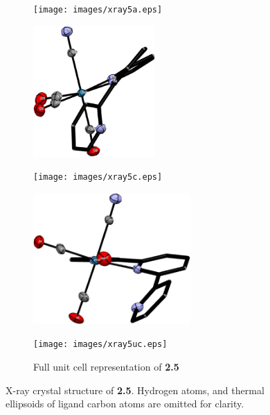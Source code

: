 \begin{figure}[!ht]
 \centering
 \begin{subfigure}[b]{0.49\textwidth}
  \texttt{[image: images/xray5a.eps]}
 \end{subfigure}
 \begin{subfigure}[b]{0.49\textwidth}
  \includegraphics[clip=true, width=\textwidth, height=50mm, keepaspectratio]{images/xray5b.eps}
 \end{subfigure}
 \begin{subfigure}[b]{0.49\textwidth}
  \texttt{[image: images/xray5c.eps]}
 \end{subfigure}
 \begin{subfigure}[b]{0.49\textwidth}
  \includegraphics[clip=true, width=\textwidth, height=50mm, keepaspectratio]{images/xray5d.eps}
 \end{subfigure}
 \begin{subfigure}[b]{\textwidth}
  \centering
  \texttt{[image: images/xray5uc.eps]}
  \caption{Full unit cell representation of \textbf{2.5}}
 \end{subfigure}
\caption[X-ray crystal structure of \textbf{2.5}]{X-ray crystal structure of \textbf{2.5}. Hydrogen atoms, and thermal ellipsoids of ligand carbon atoms are omitted for clarity.}
\label{fig.xray25}
\end{figure}

